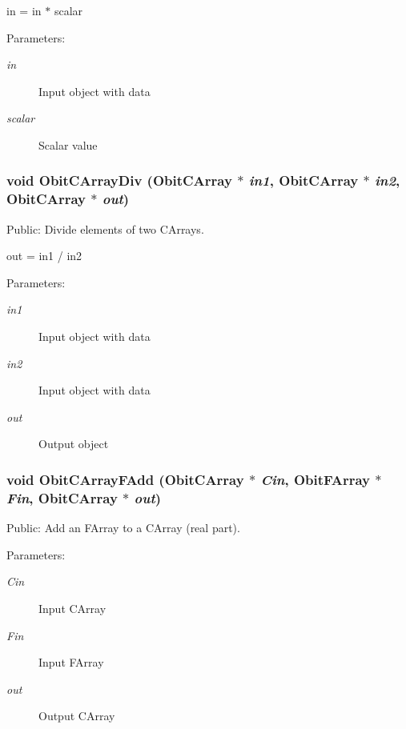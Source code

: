 in = in $\ast$ scalar \begin{Desc}
\item[Parameters:]
\begin{description}
\item[{\em in}]Input object with data \item[{\em scalar}]Scalar value \end{description}
\end{Desc}
\subsubsection{\setlength{\rightskip}{0pt plus 5cm}void Obit\-CArray\-Div ({\bf Obit\-CArray} $\ast$ {\em in1}, {\bf Obit\-CArray} $\ast$ {\em in2}, {\bf Obit\-CArray} $\ast$ {\em out})}\label{ObitCArray_8h_a55}


Public: Divide elements of two CArrays. 

out = in1 / in2 \begin{Desc}
\item[Parameters:]
\begin{description}
\item[{\em in1}]Input object with data \item[{\em in2}]Input object with data \item[{\em out}]Output object \end{description}
\end{Desc}
\subsubsection{\setlength{\rightskip}{0pt plus 5cm}void Obit\-CArray\-FAdd ({\bf Obit\-CArray} $\ast$ {\em Cin}, {\bf Obit\-FArray} $\ast$ {\em Fin}, {\bf Obit\-CArray} $\ast$ {\em out})}\label{ObitCArray_8h_a62}


Public: Add an FArray to a CArray (real part). 

\begin{Desc}
\item[Parameters:]
\begin{description}
\item[{\em Cin}]Input CArray \item[{\em Fin}]Input FArray \item[{\em out}]Output CArray \end{description}
\end{Desc}
